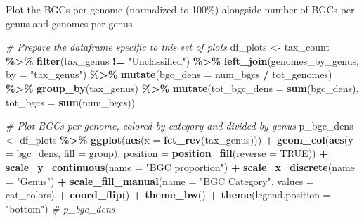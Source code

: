 \documentclass[
]{article}
\newenvironment{Shaded}{\begin{snugshade}}{\end{snugshade}}
\newcommand{\AttributeTok}[1]{\textcolor[rgb]{0.13,0.29,0.53}{#1}}
\newcommand{\CommentTok}[1]{\textcolor[rgb]{0.56,0.35,0.01}{\textit{#1}}}
\newcommand{\ConstantTok}[1]{\textcolor[rgb]{0.56,0.35,0.01}{#1}}
\newcommand{\FunctionTok}[1]{\textcolor[rgb]{0.13,0.29,0.53}{\textbf{#1}}}
\newcommand{\NormalTok}[1]{#1}
\newcommand{\OtherTok}[1]{\textcolor[rgb]{0.56,0.35,0.01}{#1}}
\newcommand{\SpecialCharTok}[1]{\textcolor[rgb]{0.81,0.36,0.00}{\textbf{#1}}}
\newcommand{\StringTok}[1]{\textcolor[rgb]{0.31,0.60,0.02}{#1}}
\begin{document}
Plot the BGCs per genome (normalized to 100\%) alongside number of BGCs
per genus and genomes per genus

\begin{Shaded}
\begin{Highlighting}[]
\CommentTok{\# Prepare the dataframe specific to this set of plots}
\NormalTok{df\_plots }\OtherTok{\textless{}{-}}\NormalTok{ tax\_count }\SpecialCharTok{\%\textgreater{}\%}
  \FunctionTok{filter}\NormalTok{(tax\_genus }\SpecialCharTok{!=} \StringTok{"Unclassified"}\NormalTok{) }\SpecialCharTok{\%\textgreater{}\%}
  \FunctionTok{left\_join}\NormalTok{(genomes\_by\_genus, }\AttributeTok{by =} \StringTok{"tax\_genus"}\NormalTok{) }\SpecialCharTok{\%\textgreater{}\%}
  \FunctionTok{mutate}\NormalTok{(}\AttributeTok{bgc\_dens =}\NormalTok{ num\_bgcs }\SpecialCharTok{/}\NormalTok{ tot\_genomes) }\SpecialCharTok{\%\textgreater{}\%}
  \FunctionTok{group\_by}\NormalTok{(tax\_genus) }\SpecialCharTok{\%\textgreater{}\%}
  \FunctionTok{mutate}\NormalTok{(}\AttributeTok{tot\_bgc\_dens =} \FunctionTok{sum}\NormalTok{(bgc\_dens), }\AttributeTok{tot\_bgcs =} \FunctionTok{sum}\NormalTok{(num\_bgcs))}

\CommentTok{\# Plot BGCs per genome, colored by category and divided by genus}
\NormalTok{p\_bgc\_dens }\OtherTok{\textless{}{-}}\NormalTok{ df\_plots }\SpecialCharTok{\%\textgreater{}\%}
  \FunctionTok{ggplot}\NormalTok{(}\FunctionTok{aes}\NormalTok{(}\AttributeTok{x =} \FunctionTok{fct\_rev}\NormalTok{(tax\_genus))) }\SpecialCharTok{+}
  \FunctionTok{geom\_col}\NormalTok{(}\FunctionTok{aes}\NormalTok{(}\AttributeTok{y =}\NormalTok{ bgc\_dens, }\AttributeTok{fill =}\NormalTok{ group), }\AttributeTok{position =} \FunctionTok{position\_fill}\NormalTok{(}\AttributeTok{reverse =} \ConstantTok{TRUE}\NormalTok{)) }\SpecialCharTok{+}
  \FunctionTok{scale\_y\_continuous}\NormalTok{(}\AttributeTok{name =} \StringTok{"BGC proportion"}\NormalTok{) }\SpecialCharTok{+}
  \FunctionTok{scale\_x\_discrete}\NormalTok{(}\AttributeTok{name =} \StringTok{"Genus"}\NormalTok{) }\SpecialCharTok{+}
  \FunctionTok{scale\_fill\_manual}\NormalTok{(}\AttributeTok{name =} \StringTok{"BGC Category"}\NormalTok{, }\AttributeTok{values =}\NormalTok{ cat\_colors) }\SpecialCharTok{+}
  \FunctionTok{coord\_flip}\NormalTok{() }\SpecialCharTok{+}
  \FunctionTok{theme\_bw}\NormalTok{() }\SpecialCharTok{+}
  \FunctionTok{theme}\NormalTok{(}\AttributeTok{legend.position =} \StringTok{"bottom"}\NormalTok{)}
\CommentTok{\# p\_bgc\_dens}


\end{Highlighting}
\end{Shaded}
\end{document}
